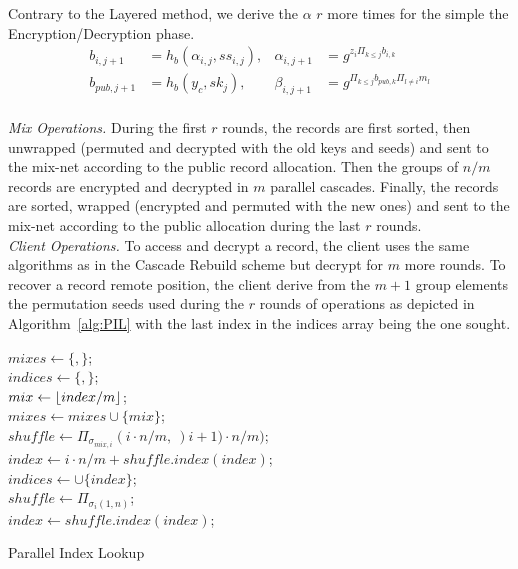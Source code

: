 \documentclass[USenglish,oneside,twocolumn]{article}
\DeclarePairedDelimiter\floor{\lfloor}{\rfloor}
\begin{document}
Contrary to the Layered method, we derive the $\alpha$ $r$ more times for the simple the Encryption/Decryption phase. 
\begin{align*}
b_{i,j+1}&=h_b(\alpha_{i,j}, ss_{i,j}), & \alpha_{i,j+1} &= g^{z_i\Pi_{k\leq j}b_{i,k}}\\
b_{pub,j+1}&=h_b(y_c, sk_{j}), &\beta_{i, j+1} &= g^{\Pi_{k\leq j}b_{pub,k}\Pi_{l\neq i}m_l}\\
\end{align*}

\noindent\textit{Mix Operations.} During the first $r$ rounds, the records are first sorted, then  unwrapped (permuted and decrypted with the old keys and seeds) and sent to the mix-net according to the public record allocation. Then the groups of $n/m$ records are encrypted and decrypted in $m$ parallel cascades. Finally, the records are sorted, wrapped (encrypted and permuted with the new ones) and sent to the mix-net according to the public allocation during the last $r$ rounds.\\

\noindent\textit{Client Operations.} To access and decrypt a record, the client uses the same algorithms as in the Cascade Rebuild scheme but decrypt for $m$ more rounds.  To recover a record remote position, the client derive from the $m+1$ group elements the permutation seeds used during the $r$ rounds of operations as depicted in Algorithm~\ref{alg:PIL} with the last index in the indices array being the one sought.\\

\begin{algorithm}
\DontPrintSemicolon
{}
$mixes \gets \{,\}$;\\
$indices \gets \{,\}$;\\
{
	$mix \gets \floor{index/m}$;\\
	$mixes \gets mixes \cup \{mix \}$;\\
	$shuffle \gets {\Pi}_{\sigma_{mix,i}}(i\cdot n / m,\ )i+1)\cdot n / m)$;\\
	$index \gets i\cdot n/m + shuffle.index(index)$;\\
	$indices \gets \cup \{index\}$;\\
	$shuffle \gets {\Pi}_{\sigma_{i}(1,n)}$;\\
	$index \gets shuffle.index(index)$;\\
}
\caption{Parallel Index Lookup}
\label{alg:PIL}
\end{algorithm}
\end{document}
